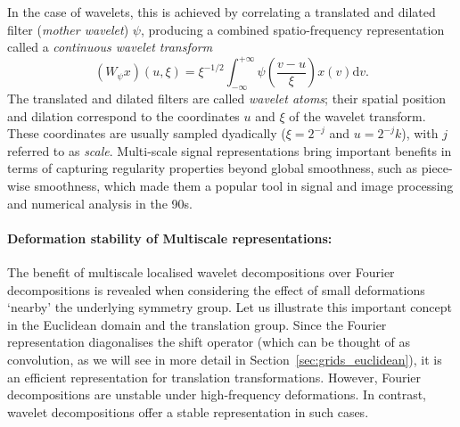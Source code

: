 In the case of wavelets, this is achieved by correlating a translated and dilated filter ({\em mother wavelet}) $\psi$, producing a combined spatio-frequency representation called a  {\em continuous wavelet transform} 
%
$$
(W_\psi x)(u,\xi) = \xi^{-1/2} \int_{-\infty}^{+\infty} 
\psi\left(\frac{v-u}{\xi}\right) x(v) \mathrm{d}v.
$$
%
The translated and dilated filters are called {\em wavelet atoms}; %
their spatial position and dilation correspond to the coordinates $u$ and $\xi$ of the wavelet transform. 
%
These coordinates are usually sampled dyadically ($\xi=2^{-j}$ and $u = 2^{-j}k$), with $j$ referred to as {\em scale}.  
%
%
%
Multi-scale signal representations bring important benefits in terms of capturing regularity properties beyond global smoothness, such as piece-wise smoothness, which made them a popular tool in signal and image processing and numerical analysis in the 90s. 

\paragraph{Deformation stability of Multiscale representations:}
The benefit of multiscale localised wavelet decompositions over Fourier decompositions is revealed when considering the effect of small deformations `nearby' the underlying symmetry group. Let us illustrate this important concept in the Euclidean domain and the translation group.   
Since the Fourier representation diagonalises the shift operator (which can be thought of as convolution, as we will see in more detail in  Section~\ref{sec:grids_euclidean}), it is an efficient representation for translation transformations. However, Fourier decompositions are unstable under high-frequency deformations. 
%
In contrast, wavelet decompositions offer a stable representation in such cases. 

